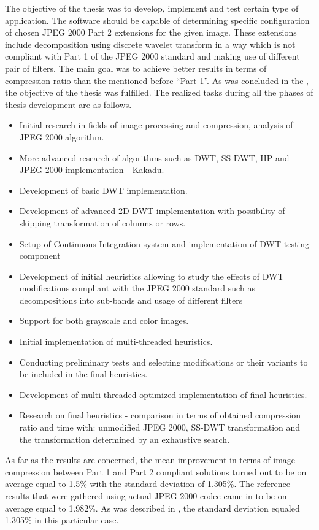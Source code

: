 The objective of the thesis was to develop, implement and test certain type of application. The software
should be capable of determining specific configuration of chosen JPEG 2000 Part 2 extensions for
the given image. These extensions include decomposition using discrete wavelet transform in a way
which is not compliant with Part 1 of the JPEG 2000 standard and making use of different pair of filters.
The main goal was to achieve better results in terms of compression ratio than the mentioned before
``Part 1''. As was concluded in the , the objective of the thesis was fulfilled.
The realized tasks during all the phases of thesis development are as follows.
\begin{itemize}
    \item Initial research in fields of image processing and compression, analysis of JPEG 2000 algorithm. 
    \item More advanced research of algorithms such as DWT, SS-DWT, HP and JPEG 2000 implementation - Kakadu.
    \item Development of basic DWT implementation.
    \item Development of advanced 2D DWT implementation with possibility of skipping transformation of columns or rows.
    \item Setup of Continuous Integration system and implementation of DWT testing component 
    \item Development of initial heuristics allowing to study the effects of DWT modifications compliant
    with the JPEG 2000 standard such as decompositions into sub-bands and usage of different filters
    \item Support for both grayscale and color images.
    \item Initial implementation of multi-threaded heuristics.
    \item Conducting preliminary tests and selecting modifications or their variants to be included in the final heuristics.
    \item Development of multi-threaded optimized implementation of final heuristics.
    \item Research on final heuristics - comparison in terms of obtained compression ratio and time with: unmodified JPEG 2000,
    SS-DWT transformation and the transformation determined by an exhaustive search.
\end{itemize}

As far as the results are concerned, the mean improvement in terms of image compression between
Part 1 and Part 2 compliant solutions turned out to be on average equal to 1.5\% with the
standard deviation of 1.305\%. The reference results that were gathered using actual JPEG 2000
codec came in to be on average equal to 1.982\%. As was described in ,
the standard deviation equaled 1.305\% in this particular case.

